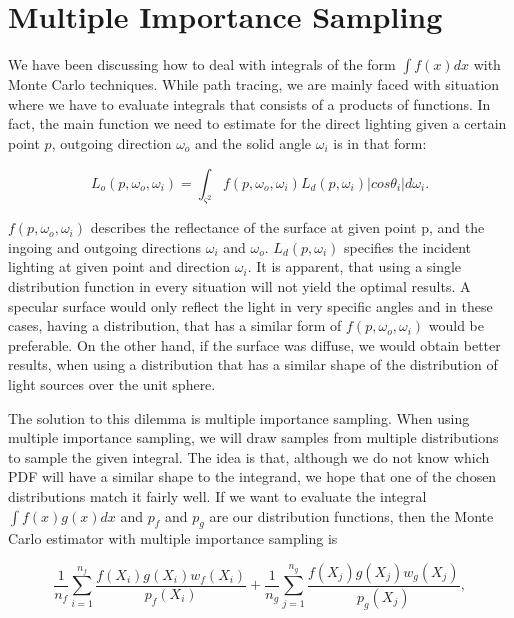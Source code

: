 \section{Multiple Importance Sampling}
\label{ch:preliminaries:mis}

We have been discussing how to deal with integrals of the form $\int{f(x)dx}$ with Monte Carlo techniques. While path tracing, we are mainly faced with situation where we have to evaluate integrals that consists of a products of functions. In fact, the main function we need to estimate for the direct lighting given a certain point $p$, outgoing direction $\omega_o$ and the solid angle $\omega_i$ is in that form:

\begin{equation}
L_o(p, \omega_o, \omega_i) = \int_{\varsigma^2}f(p, \omega_o, \omega_i)L_d(p, \omega_i)|cos\theta_i|d\omega_i.
\end{equation}

$f(p, \omega_o, \omega_i)$ describes the reflectance of the surface at given point p, and the ingoing and outgoing directions $\omega_i$ and $\omega_o$. $L_d(p, \omega_i)$ specifies the incident lighting at given point and direction $\omega_i$. It is apparent, that using a single distribution function in every situation will not yield the optimal results. A specular surface would only reflect the light in very specific angles and in these cases, having a distribution, that has a similar form of $f(p, \omega_o, \omega_i)$ would be preferable. On the other hand, if the surface was diffuse, we would obtain better results, when using a distribution that has a similar shape of the distribution of light sources over the unit sphere.

The solution to this dilemma is multiple importance sampling. When using multiple importance sampling, we will draw samples from multiple distributions to sample the given integral. The idea is that, although we do not know which PDF will have a similar shape to the integrand, we hope that one of the chosen distributions match it fairly well. If we want to evaluate the integral $\int{f(x)g(x)dx}$ and $p_f$ and $p_g$ are our distribution functions, then the Monte Carlo estimator with multiple importance sampling is

\begin{equation}
\frac{1}{n_f}\sum_{i = 1}^{n_f}{\frac{f(X_i)g(X_i)w_f(X_i)}{p_f(X_i)}}+ \frac{1}{n_g}\sum_{j = 1}^{n_g}{\frac{f(X_j)g(X_j)w_g(X_j)}{p_g(X_j)}},
\end{equation}

